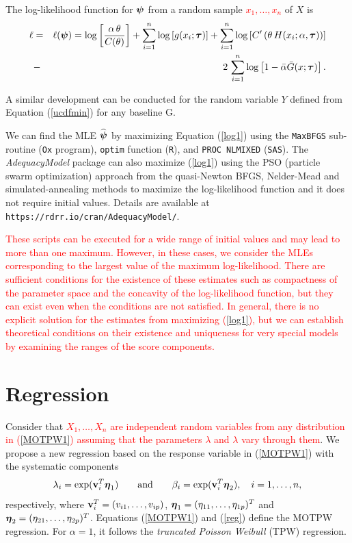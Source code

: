 \documentclass[12pt]{article}
\newcommand{\vn}{{\bf v}}
\newcommand{\etn}{{\mbox{\boldmath $\eta$}}}
\newcommand{\psin}{{\mbox{\boldmath $\psi$}}}
\begin{document}
The log-likelihood function for $\psin$ from a random sample \textcolor{red}{$x_{1},\ldots,x_{n}$} of $X$ is
\begin{eqnarray}
\ell &=&\ell (\psin)=\log\left[\frac{\alpha\,\theta}{C(\theta)}\right]+\sum_{i=1}^n
\log\left[g(x_i;\bm{\tau})\right]+\sum_{i=1}^n
\log\left[C^{\prime}\left(\theta\,H(x_i;\alpha,\bm{\tau})\right)\right]\nonumber\\
&-&2\,\sum_{i=1}^n
\log\left[1-\bar{\alpha}\bar{G}(x;\bm{\tau})\right].\label{log1}
\end{eqnarray}

A similar development can be conducted for the random variable $Y$ defined from Equation (\ref{ucdfmin}) for any baseline G.

We can find the MLE $\widehat{\psin}$ by maximizing Equation (\ref{log1}) using the \texttt{MaxBFGS} sub-routine (\texttt{Ox} program), 
\texttt{optim} function (\texttt{R}), and \texttt{PROC NLMIXED} (\texttt{SAS}). 
The {\it AdequacyModel} package can also maximize (\ref{log1}) using the PSO (particle swarm optimization)
approach from the quasi-Newton BFGS, Nelder-Mead and simulated-annealing methods to maximize the log-likelihood function and it does not require
initial values. Details are available at {\tt https://rdrr.io/cran/AdequacyModel/}.

\textcolor{red}{These scripts can be executed for a wide range of initial values and may lead to more
than one maximum. However, in these cases, we consider the MLEs corresponding to the largest value of the maximum log-likelihood.
There are sufficient conditions for the existence of these estimates such as compactness of the parameter space and the concavity of the log-likelihood function, but they can exist even when the conditions are not satisfied. In general, there is no explicit solution for the estimates from maximizing (\ref{log1}),
but we can establish theo\-re\-tical conditions on their existence and uniqueness for very special models by examining the ranges of the
score components.}




\section{Regression}\label{sec:regression}

Consider that  \textcolor{red}{$X_1,\ldots,X_n$ are independent random variables from any distribution in (\ref{MOTPW1}) assuming
that the parameters $\lambda$ and $\lambda$ vary through them}. We propose a new regression based on the response variable in (\ref{MOTPW1})
with the systematic components
\begin{eqnarray}\label{reg}
\lambda_{i}=\exp(\vn_{i}^{T}\etn_1)\quad \quad \mbox{and}\quad\quad
\beta_{i}=\exp(\vn_{i}^{T}\etn_2), \quad i=1,\ldots,n,
\end{eqnarray}
respectively, where \textcolor{red}{$\vn_{i}^{T}=(v_{i1},\ldots,v_{ip})$},
\textcolor{red}{$\etn_1=(\eta_{11},\ldots,\eta_{1p})^{T}$} and \textcolor{red}{$\etn_2=(\eta_{21},\ldots,\eta_{2p})^{T}$}.
Equations (\ref{MOTPW1}) and (\ref{reg}) define the MOTPW regression.
For $\alpha=1$, it follows the {\it truncated Poisson Weibull} (TPW) regression.
\end{document}
